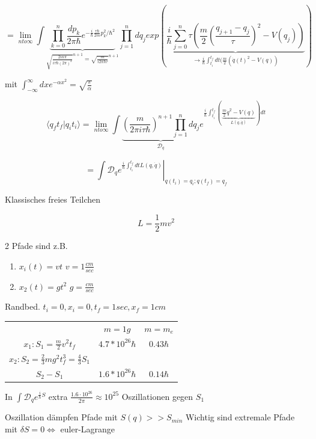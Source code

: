 \[= \lim_{n to \infty}\int \underbrace{\prod_{k=0}^n \frac{dp_k}{2\pi \hbar}e^{-\frac{i}{\hbar}\frac{\tau\hbar}{2m}p^2_k/\hbar^2}}_{\sqrt{\frac{2in\pi}{i\tau \hbar(2\pi)^2}}^{n+1}=\sqrt{\frac{m}{i2\pi\hbar\tau}}^{n+1}}\prod_{j=1}^n dq_j exp(\underbrace{\frac{i}{\hbar}\sum_{j=0}^n\tau(\frac{m}{2}(\frac{q_{j+1}-q_j}{\tau})^2-V(q_j))}_{\rightarrow \frac{i}{\hbar}\int_{t_i}^{t_f}dt(\frac{m}{2}(\dot q(t)^2-V(q))})\]


mit \(\int_{-\infty}^\infty dxe^{-\alpha x^2}=\sqrt{\frac{\pi}{\alpha}}\)


\[\langle q_ft_f|q_it_i\rangle = \lim_{n to \infty} \int \underbrace{(\frac{m}{2\pi i\tau \hbar})^{n+1}\prod_{j=1}^n dq_j}_{\mathcal D_q}e^{\frac{i}{\hbar}\int_{t_i}^{t_f}(\underbrace{\frac{m}{2}\dot q^2-V(q)}_{L(q,\dot q)})dt}\]

\[=\left.\int \mathcal D_q e^{\frac{i}{\hbar}\int_{t_i}^{t_f}dtL(q,\dot q)}\right|_{q(t_i)=q_i; q(t_f) = q_f}\]


Klassisches freies Teilchen

\[L = \frac{1}{2}mv^2\]

2 Pfade sind z.B. 
\begin{enumerate}
\item \(x_i(t) = vt\)  \(v=1\frac{cm}{sec}\)
\item \(x_2(t) = gt^2\) \(g = \frac{cm}{sec}\)
\end{enumerate}

Randbed. \(t_i = 0, x_i = 0, t_f = 1sec, x_f = 1cm\)

\begin{tabular}{ccc}
&\(m=1g\) & \(m=m_e\)\\
  \(x_1: S_1 = \frac{m}{2} v^2 t_f\)  &  \(4.7*10^26\hbar\) &   \(0.43\hbar\) \\
\(x_2: S_2 = \frac{2}{3} mg^2 t^3_f= \frac{4}{3}S_1\)  &&\\
\(S_2-S_1\) &  \( 1.6*10^26\hbar\)& \(0.14\hbar\)
\end{tabular}


In \(\int \mathcal D_q e^{\frac{i}{\hbar}S}\) extra \(\frac{1.6\cdot 10^{26}}{2\pi}\approx 10^{25}\) Oszillationen gegen \(S_1\)

Oszillation dämpfen Pfade mit \(S(q)>>S_{min}\)
Wichtig sind extremale Pfade mit \(\delta S = 0 \Leftrightarrow \) euler-Lagrange



